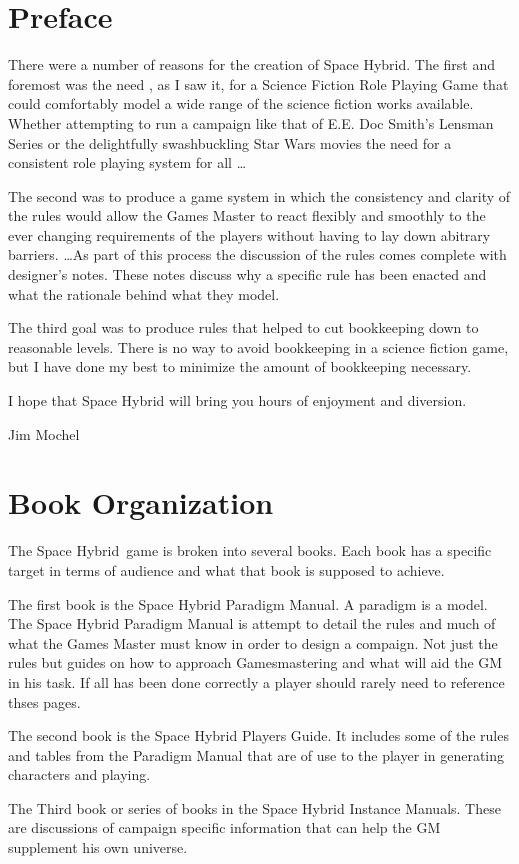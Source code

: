 \chapter*{Preface}

There were a number of reasons for the creation of Space Hybrid. The 
first and foremost was the need , as I saw it, for a Science 
Fiction Role Playing Game that could comfortably model a wide range
of the science fiction works available. Whether attempting to run 
a campaign like that of E.E. Doc Smith's Lensman Series or the 
delightfully swashbuckling {Star Wars} movies the need for a consistent
role playing system for all \dots

The second was to produce a game system in which the consistency 
and clarity of the rules would allow the Games Master to 
react flexibly and smoothly to the ever changing requirements
of the players without having to lay down abitrary barriers.
\dots As part of this process the discussion of the rules comes 
complete with designer's notes. These notes discuss why a 
specific rule has been enacted and what the rationale behind 
what they model. 

The third goal was to produce rules that helped to cut
bookkeeping down to reasonable levels. There is no way to avoid 
bookkeeping in a science fiction game, but I have done my best to
minimize the amount of bookkeeping necessary.

I hope that Space Hybrid will bring you hours of enjoyment and
diversion.

\begin{em}
	Jim Mochel
\end{em}

\chapter*{Book Organization}

The Space Hybrid\ game is broken into several books. Each book has
a specific target in terms of audience and what that book is supposed 
to achieve.

The first book is the Space Hybrid Paradigm Manual. A paradigm is a model.
The Space Hybrid Paradigm Manual is attempt to detail the rules and 
much of what the Games Master must know in order to design a compaign. 
Not just the rules but guides on how to approach Gamesmastering and what will aid the 
GM in his task. If all has been done correctly a player should rarely need to reference 
thses pages.

The second book is the Space Hybrid Players Guide. It includes 
some of the rules and tables from the Paradigm Manual that are of use to
the player in generating characters and playing. 

The Third book or series of books in the Space Hybrid Instance Manuals.
These are discussions of campaign specific information that can help the
GM supplement his own universe.


